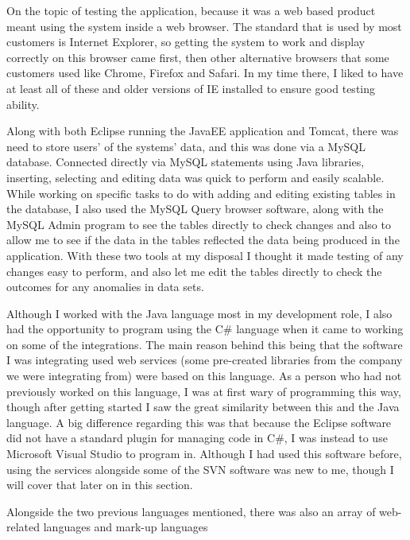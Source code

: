 \documentclass[12pt]{article}
\begin{document}
On the topic of testing the application, because it was a web based product meant using the system inside a web browser.
The standard that is used by most customers is Internet Explorer, so getting the system to work and display correctly on
this browser came first, then other alternative browsers that some customers used like Chrome, Firefox and Safari. In my
time there, I liked to have at least all of these and older versions of IE installed to ensure good testing ability. \\
\par \noindent
Along with both Eclipse running the JavaEE application and Tomcat, there was need to store users’ of the systems’ data,
and this was done via a MySQL database. Connected directly via MySQL statements using Java libraries, inserting,
selecting and editing data was quick to perform and easily scalable. While working on specific tasks to do with adding
and editing existing tables in the database, I also used the MySQL Query browser software, along with the MySQL Admin
program to see the tables directly to check changes and also to allow me to see if the data in the tables reflected the
data being produced in the application. With these two tools at my disposal I thought it made testing of any changes
easy to perform, and also let me edit the tables directly to check the outcomes for any anomalies in data sets.\\ \par
\noindent
Although I worked with the Java language most in my development role, I also had the opportunity to program using the C\#
language when it came to working on some of the integrations. The main reason behind this being that the software I was
integrating used web services (some pre-created libraries from the company we were integrating from) were based on this
language. As a person who had not previously worked on this language, I was at first wary of programming this way,
though after getting started I saw the great similarity between this and the Java language. A big difference regarding
this was that because the Eclipse software did not have a standard plugin for managing code in C\#, I was instead to use
Microsoft Visual Studio to program in. Although I had used this software before, using the services alongside some of
the SVN software was new to me, though I will cover that later on in this section.\\ \par \noindent
Alongside the two previous languages mentioned, there was also an array of web-related languages and mark-up languages
\end{document}
